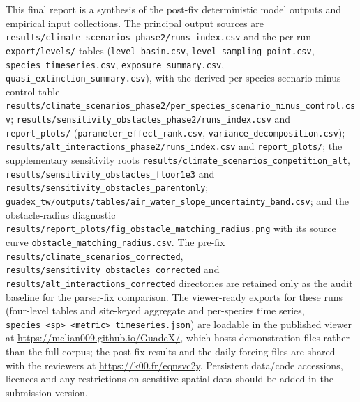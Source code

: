 \documentclass[11pt,a4paper]{article}
\begin{document}
This final report is a synthesis of the post-fix deterministic model outputs and empirical input collections. The principal output sources are \texttt{results/climate\_scenarios\_phase2/runs\_index.csv} and the per-run \texttt{export/levels/} tables (\texttt{level\_basin.csv}, \texttt{level\_sampling\_point.csv}, \texttt{species\_timeseries.csv}, \texttt{exposure\_summary.csv}, \texttt{quasi\_extinction\_summary.csv}), with the derived per-species scenario-minus-control table \texttt{results/climate\_scenarios\_phase2/per\_species\_scenario\_minus\_control.csv}; \texttt{results/sensitivity\_obstacles\_phase2/runs\_index.csv} and \texttt{report\_plots/} (\texttt{parameter\_effect\_rank.csv}, \texttt{variance\_decomposition.csv}); \texttt{results/alt\_interactions\_phase2/runs\_index.csv} and \texttt{report\_plots/}; the supplementary sensitivity roots \texttt{results/climate\_scenarios\_competition\_alt}, \texttt{results/sensitivity\_obstacles\_floor1e3} and \texttt{results/sensitivity\_obstacles\_parentonly}; \texttt{guadex\_tw/outputs/tables/air\_water\_slope\_uncertainty\_band.csv}; and the obstacle-radius diagnostic \texttt{results/report\_plots/fig\_obstacle\_matching\_radius.png} with its source curve \texttt{obstacle\_matching\_radius.csv}. The pre-fix \texttt{results/climate\_scenarios\_corrected}, \texttt{results/sensitivity\_obstacles\_corrected} and \texttt{results/alt\_interactions\_corrected} directories are retained only as the audit baseline for the parser-fix comparison. The viewer-ready exports for these runs (four-level tables and site-keyed aggregate and per-species time series, \texttt{species\_<sp>\_<metric>\_timeseries.json}) are loadable in the published viewer at \url{https://melian009.github.io/GuadeX/}, which hosts demonstration files rather than the full corpus; the post-fix results and the daily forcing files are shared with the reviewers at \url{https://k00.fr/eqnsvc2y}. Persistent data/code accessions, licences and any restrictions on sensitive spatial data should be added in the submission version.



\end{document}
